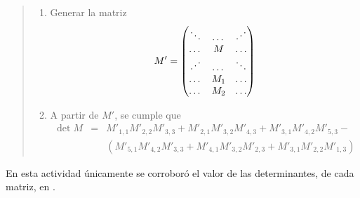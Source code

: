 \documentclass[12pt]{article}
\newcommand{\dotsd}[0]	{\reflectbox{$\ddots$}}
\begin{document}
	\begin{quote}\begin{enumerate}
		\item Generar la matriz 
			$$M' = 
				\begin{pmatrix}
					\ddots&\dots&\dotsd\\
					\dots & M& \dots	\\
					\dotsd&\dots&\ddots\\
					\dots & M_1 & \dots\\
					\dots & M_2 & \dots
				\end{pmatrix}$$
		\item A partir de $M'$, se cumple que
		\begin{eqnarray*}	
			\det{M} &=& {M'}_{1,1} {M'}_{2,2} {M'}_{3,3} + 
						{M'}_{2,1} {M'}_{3,2} {M'}_{4,3} +
						{M'}_{3,1} {M'}_{4,2} {M'}_{5,3} - \\ & &(
						{M'}_{5,1} {M'}_{4,2} {M'}_{3,3} +
						{M'}_{4,1} {M'}_{3,2} {M'}_{2,3} +
						{M'}_{3,1} {M'}_{2,2} {M'}_{1,3} )
		\end{eqnarray*}
	\end{enumerate}\end{quote}
	
	En esta actividad \'unicamente se corrobor\'o el valor de las determinantes, de cada matriz, en 
	\cite[Actividad 3]{notebook}.
\end{document}
